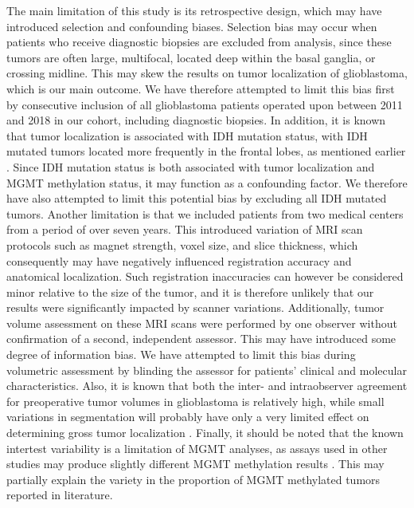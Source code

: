 The main limitation of this study is its retrospective design, which may have introduced selection and confounding biases.
Selection bias may occur when patients who receive diagnostic biopsies are excluded from analysis, since these tumors are often large, multifocal, located deep within the basal ganglia, or crossing midline.
This may skew the results on tumor localization of glioblastoma, which is our main outcome.
We have therefore attempted to limit this bias first by consecutive inclusion of all glioblastoma patients operated upon between 2011 and 2018 in our cohort, including diagnostic biopsies.
In addition, it is known that tumor localization is associated with \gls{IDH} mutation status, with \gls{IDH} mutated tumors located more frequently in the frontal lobes, as mentioned earlier \autocite{lai2011evidence}.
Since \gls{IDH} mutation status is both associated with tumor localization and \gls{MGMT} methylation status, it may function as a confounding factor.
We therefore have also attempted to limit this potential bias by excluding all \gls{IDH} mutated tumors.
Another limitation is that we included patients from two medical centers from a period of over seven years.
This introduced variation of \gls{MRI} scan protocols such as magnet strength, voxel size, and slice thickness, which consequently may have negatively influenced registration accuracy and anatomical localization.
Such registration inaccuracies can however be considered minor relative to the size of the tumor, and it is therefore unlikely that our results were significantly impacted by scanner variations.
Additionally, tumor volume assessment on these \gls{MRI} scans were performed by one observer without confirmation of a second, independent assessor.
This may have introduced some degree of information bias.
We have attempted to limit this bias during volumetric assessment by blinding the assessor for patients' clinical and molecular characteristics.
Also, it is known that both the inter- and intraobserver agreement for preoperative tumor volumes in glioblastoma is relatively high, while small variations in segmentation will probably have only a very limited effect on determining gross tumor localization \autocite{kubben2010intraobserver}.
Finally, it should be noted that the known intertest variability is a limitation of \gls{MGMT} analyses, as assays used in other studies may produce slightly different \gls{MGMT} methylation results \autocite{wick2014mgmt}.
This may partially explain the variety in the proportion of \gls{MGMT} methylated tumors reported in literature.

